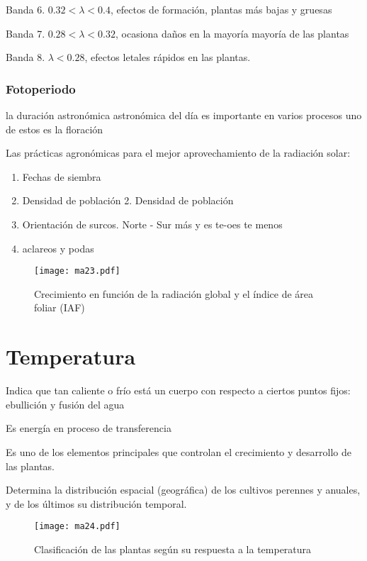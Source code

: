 Banda 6. $0.32 < \lambda < 0.4$, efectos de formación, plantas más bajas y gruesas

Banda 7. $0.28 < \lambda < 0.32$, ocasiona daños en la mayoría mayoría de las plantas

Banda 8. $\lambda < 0.28$, efectos letales rápidos en las plantas.

\subsubsection{Fotoperiodo}
la duración astronómica astronómica del día es importante en varios procesos uno de estos es la floración

Las prácticas agronómicas para el mejor aprovechamiento de la radiación solar:
\begin{enumerate}
    \item Fechas de siembra
    \item Densidad de población 2. Densidad de población
    \item Orientación de surcos. Norte - Sur más y es te-oes te menos
    \item aclareos y podas 
\end{enumerate}
\begin{figure}[h!]
\centering
  \texttt{[image: ma23.pdf]}
  \caption{Crecimiento en función de la radiación global y el índice de área foliar (IAF)}
  \label{ma23}
\end{figure}

\section{Temperatura}

\begin{definition}[Temperatura]
    Indica que tan caliente o frío está un cuerpo con respecto a ciertos puntos fijos: ebullición y fusión del agua
\end{definition}
\begin{definition}[Calor]
    Es energía en proceso de transferencia
\end{definition}
Es uno de los elementos principales que controlan el crecimiento y desarrollo de las plantas.

Determina la distribución espacial (geográfica) de los cultivos perennes y anuales, y de los últimos su distribución temporal.
\begin{figure}[h!]
\centering
  \texttt{[image: ma24.pdf]}
  \caption{Clasificación de las plantas según su respuesta a la temperatura}
  \label{ma24}
\end{figure}

